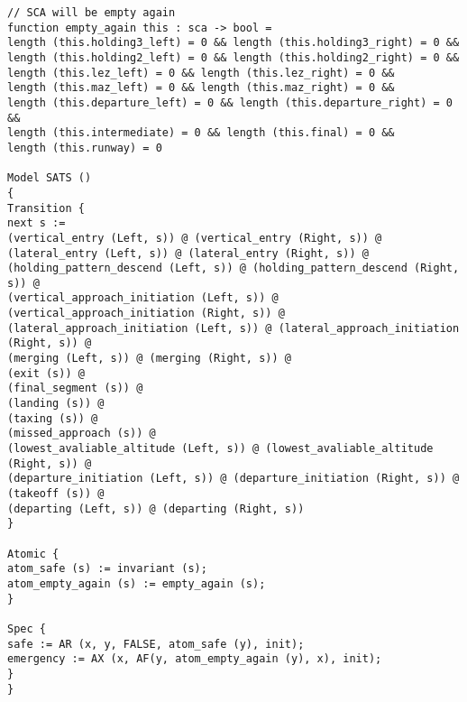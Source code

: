 \begin{verbatim}
// SCA will be empty again
function empty_again this : sca -> bool = 
length (this.holding3_left) = 0 && length (this.holding3_right) = 0 &&
length (this.holding2_left) = 0 && length (this.holding2_right) = 0 &&
length (this.lez_left) = 0 && length (this.lez_right) = 0 &&
length (this.maz_left) = 0 && length (this.maz_right) = 0 &&
length (this.departure_left) = 0 && length (this.departure_right) = 0 &&
length (this.intermediate) = 0 && length (this.final) = 0 &&
length (this.runway) = 0

Model SATS () 
{
Transition {
next s := 
(vertical_entry (Left, s)) @ (vertical_entry (Right, s)) @
(lateral_entry (Left, s)) @ (lateral_entry (Right, s)) @
(holding_pattern_descend (Left, s)) @ (holding_pattern_descend (Right, s)) @
(vertical_approach_initiation (Left, s)) @ (vertical_approach_initiation (Right, s)) @
(lateral_approach_initiation (Left, s)) @ (lateral_approach_initiation (Right, s)) @
(merging (Left, s)) @ (merging (Right, s)) @
(exit (s)) @
(final_segment (s)) @
(landing (s)) @
(taxing (s)) @
(missed_approach (s)) @
(lowest_avaliable_altitude (Left, s)) @ (lowest_avaliable_altitude (Right, s)) @ 
(departure_initiation (Left, s)) @ (departure_initiation (Right, s)) @
(takeoff (s)) @
(departing (Left, s)) @ (departing (Right, s))
}

Atomic {
atom_safe (s) := invariant (s);
atom_empty_again (s) := empty_again (s);
}

Spec {
safe := AR (x, y, FALSE, atom_safe (y), init);
emergency := AX (x, AF(y, atom_empty_again (y), x), init);
}
}

\end{verbatim}